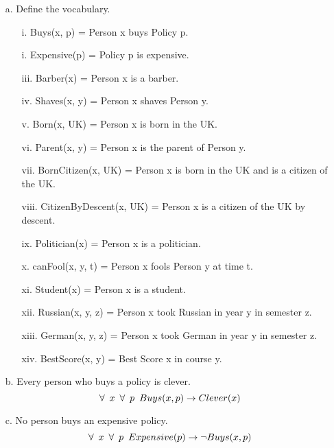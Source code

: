\documentclass[11pt]{article}
\begin{document}
\begin{flushleft}
\begin{enumerate}
    \item[a.] Define the vocabulary.
        \begin{enumerate} 
            \item[i.] Buys(x, p) = Person x buys Policy p.
            \item[i.] Expensive(p) = Policy p is expensive.
            \item[iii.] Barber(x) = Person x is a barber.
            \item[iv.] Shaves(x, y) = Person x shaves Person y.
            \item[v.] Born(x, UK) = Person x is born in the UK.
            \item[vi.] Parent(x, y) = Person x is the parent of Person y.
            \item[vii.] BornCitizen(x, UK) = Person x is born in the UK and
                is a citizen of the UK.
            \item[viii.] CitizenByDescent(x, UK) = Person x is a citizen of
                the UK by descent.
            \item[ix.] Politician(x) = Person x is a politician.
            \item[x.] canFool(x, y, t) = Person x fools Person y at time t.
            \item[xi.] Student(x) = Person x is a student.
            \item[xii.] Russian(x, y, z) = Person x took Russian in year y
                in semester z.
            \item[xiii.] German(x, y, z) = Person x took German in year y
                in semester z.
            \item[xiv.] BestScore(x, y) = Best Score x in course y.
        \end{enumerate}
    \item[b.] Every person who buys a policy is clever.
        $$ \forall \hspace{0.5em} x \hspace{0.5em} \forall \hspace{0.5em} p \hspace{0.5em}
        Buys(x, p) \rightarrow Clever(x) $$

    \item[c.] No person buys an expensive policy.
        $$ \forall \hspace{0.5em} x \hspace{0.5em} \forall \hspace{0.5em} p \hspace{0.5em}
        Expensive(p) \rightarrow \neg Buys(x, p) $$


\end{enumerate}
\end{flushleft}
\end{document}
